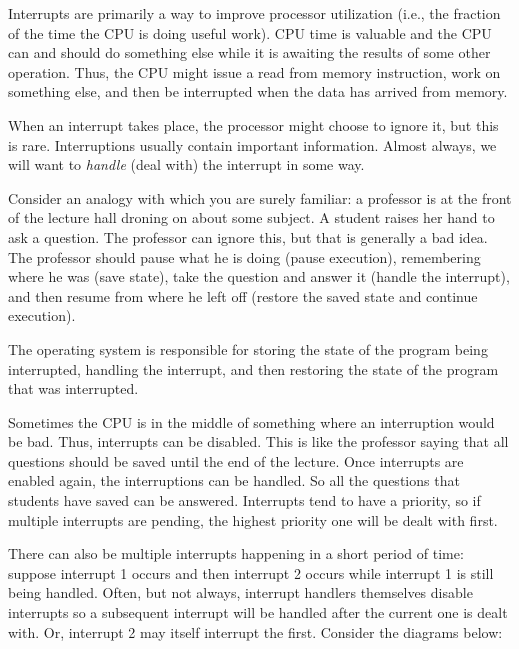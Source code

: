 \documentclass[a4paper]{report}
\begin{document}
Interrupts are primarily a way to improve processor utilization (i.e., the fraction of the time the CPU is doing useful work). CPU time is valuable and the CPU can and should do something else while it is awaiting the results of some other operation. Thus, the CPU might issue a read from memory instruction, work on something else, and then be interrupted when the data has arrived from memory.

When an interrupt takes place, the processor might choose to ignore it, but this is rare. Interruptions usually contain important information. Almost always, we will want to \textit{handle} (deal with) the interrupt in some way.

Consider an analogy with which you are surely familiar: a professor is at the front of the lecture hall droning on about some subject. A student raises her hand to ask a question. The professor can ignore this, but that is generally a bad idea. The professor should pause what he is doing (pause execution), remembering where he was (save state), take the question and answer it (handle the interrupt), and then resume from where he left off (restore the saved state and continue execution).

The operating system is responsible for storing the state of the program being interrupted, handling the interrupt, and then restoring the state of the program that was interrupted.

Sometimes the CPU is in the middle of something where an interruption would be bad. Thus, interrupts can be disabled. This is like the professor saying that all questions should be saved until the end of the lecture. Once interrupts are enabled again, the interruptions can be handled. So all the questions that students have saved can be answered. Interrupts tend to have a priority, so if multiple interrupts are pending, the highest priority one will be dealt with first.

There can also be multiple interrupts happening in a short period of time: suppose interrupt 1 occurs and then interrupt 2 occurs while interrupt 1 is still being handled. Often, but not always, interrupt handlers themselves disable interrupts so a subsequent interrupt will be handled after the current one is dealt with. Or, interrupt 2 may itself interrupt the first. Consider the diagrams below:
\end{document}
